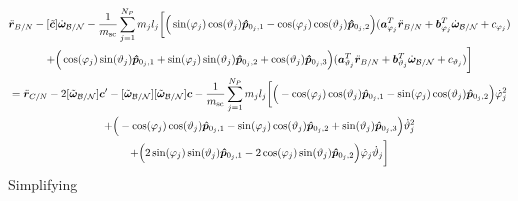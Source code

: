 \documentclass[]{BasiliskReportMemo}
\begin{document}
\begin{multline}
	\ddot{\bm r}_{B/N}-[\tilde{\bm{c}}] \dot{\bm\omega}_{\cal B/N}-\frac{1}{m_{\text{sc}}}\sum_{j=1}^{N_{P}}m_j l_j \bigg[
	\Big(\sin(\varphi_j)\cos(\vartheta_j)\bm{\hat{p}}_{0_j,1}-\cos(\varphi_j)\cos(\vartheta_j)\bm{\hat{p}}_{0_j,2}\Big)(\bm a_{\varphi_j}^T \ddot{\bm{r}}_{B/N} + \bm b_{\varphi_j}^T \dot{\bm\omega}_{\cal B/N} +c_{\varphi_j}) \\ +\Big(\cos(\varphi_j)\sin(\vartheta_j)\bm{\hat{p}}_{0_j,1}+\sin(\varphi_j)\sin(\vartheta_j)\bm{\hat{p}}_{0_j,2}+\cos(\vartheta_j)\bm{\hat{p}}_{0_j,3}\Big)(\bm a_{\vartheta_j}^T \ddot{\bm r}_{B/N} + \bm b_{\vartheta_j}^T \dot{\bm\omega}_{\cal B/N} + c_{\vartheta_j})
	\bigg]
	\\= \ddot{\bm r}_{C/N} 	- 2[\tilde{\bm\omega}_{\cal B/N}] \bm c'
	-[\tilde{\bm\omega}_{\cal B/N}][\tilde{\bm\omega}_{\cal B/N}]\bm{c}
	-\frac{1}{m_{\text{sc}}}\sum_{j=1}^{N_{P}}m_j l_j \bigg[
	\Big(-\cos(\varphi_j)\cos(\vartheta_j)\bm{\hat{p}}_{0_j,1}-\sin(\varphi_j)\cos(\vartheta_j)\bm{\hat{p}}_{0_j,2}\Big)\dot{\varphi}_j^2\\
	+\Big(-\cos(\varphi_j)\cos(\vartheta_j)\bm{\hat{p}}_{0_j,1}-\sin(\varphi_j)\cos(\vartheta_j)\bm{\hat{p}}_{0_j,2}+\sin(\vartheta_j)\bm{\hat{p}}_{0_j,3} \Big)\dot{\vartheta}_j^2\\ +
	\Big(2\sin(\varphi_j)\sin(\vartheta_j)\bm{\hat{p}}_{0_j,1} -2\cos(\varphi_j)\sin(\vartheta_j)\bm{\hat{p}}_{0_j,2}\Big)\dot{\varphi}_j\dot{\vartheta}_j
	\bigg]
	\label{eq:Rbddot5}
\end{multline}
Simplifying
\end{document}
